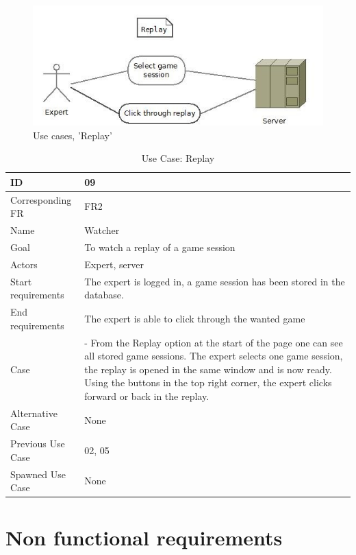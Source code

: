 \begin{figure}[H]
  \centering
    \includegraphics[width=1.0\textwidth]{img/replay.jpg}
  \caption{Use cases, 'Replay'} 
  \label{fig:replay}
\end{figure}


\begin{table}[H]
\begin{tabular}{|l|p{14cm}|}
\hline
	\textbf{ID} & \textbf{09}\\ \hline
	Corresponding FR & FR2\\ \hline
	Name & Watcher\\ \hline
	Goal & To watch a replay of a game session\\ \hline
	Actors & Expert, server\\ \hline
	Start requirements & The expert is logged in, a game session has been stored in the database. \\ \hline
	End requirements & The expert is able to click through the wanted game\\ \hline
	Case & - From the Replay option at the start of the page one can see all stored game sessions. The expert selects one game session, the replay is opened in the same window and is now ready. Using the buttons in the top right corner, the expert clicks forward or back in the replay.\\
	Alternative Case & None \\ \hline
	Previous Use Case & 02, 05\\ \hline
	Spawned Use Case & None\\ \hline
\end{tabular}
\caption{Use Case: Replay}
\label{fig:usecase09table}
\end{table}






\section{Non functional requirements} 


